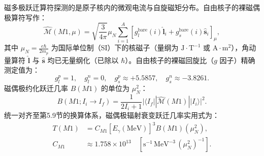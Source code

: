 磁多极跃迁算符探测的是原子核内的微观电流与自旋磁矩分布。自由核子的裸磁偶极算符写作：
\begin{equation}\label{eq:2-7-M1-bare}
\hat{\mathcal{M}}(M1, \mu) = \sqrt{\frac{3}{4\pi}} \mu_N \sum_{i=1}^A \left[ g_l^{\mathrm{bare}}(i) \hat{\mathbf{l}}_i + g_s^{\mathrm{bare}}(i) \hat{\mathbf{s}}_i \right]_\mu,
\end{equation}
其中 $\mu_N = \frac{e\hbar}{2 m_p}$ 为国际单位制（SI）下的核磁子（量纲为 $\mathrm{J}\cdot\mathrm{T}^{-1}$ 或 $\mathrm{A}\cdot\mathrm{m}^2$），角动量算符 $\hat{\mathbf{l}}$ 与 $\hat{\mathbf{s}}$ 均已无量纲化（已除以 $\hbar$）。自由核子的裸磁回旋比（$g$ 因子）精确测定值为：
\begin{equation}\label{eq:2-7-free-gfactors}
g_l^p = 1, \quad g_l^n = 0, \quad g_s^p \approx +5.5857, \quad g_s^n \approx -3.8261.
\end{equation}
磁偶极约化跃迁几率 $B(M1)$ 的单位为 $\mu_N^2$：
\begin{equation}\label{eq:2-7-BM1-def}
B(M1; I_i \to I_f) = \frac{1}{2I_i + 1} |\langle I_f || \hat{\mathcal{M}}(M1) || I_i \rangle|^2.
\end{equation}
统一对齐至第5.9节的换算体系，磁偶极辐射衰变跃迁几率实用式为：
\begin{equation}\label{eq:2-7-TM1-rate}
\begin{aligned}
T(M1) &= C_{M1} [E_\gamma(\mathrm{MeV})]^3 B(M1)(\mu_N^2), \\
C_{M1} &\approx 1.758 \times 10^{13} \quad [\mathrm{s}^{-1}\,\mathrm{MeV}^{-3}\,(\mu_N^2)^{-1}].
\end{aligned}
\end{equation}

